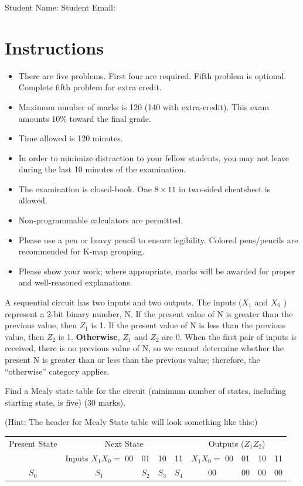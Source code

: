 \maketitle

Student Name: \hfill Student Email: \hspace{10em}
\section{Instructions}
\begin{itemize}
  \item There are five problems. First four are required. Fifth problem is optional. Complete fifth problem for extra credit.
  \item Maximum number of marks is 120 (140 with extra-credit). This exam
  amounts 10\% toward the final grade.
  \item Time allowed is 120 minutes.
  \item In order to minimize distraction to your fellow students, you may not leave
  during the last 10 minutes of the examination.
  \item The examination is closed-book. One $8\times11$ in two-sided cheatsheet is allowed.
  \item Non-programmable calculators are permitted.
  \item Please use a pen or heavy pencil to ensure legibility. Colored
    pens/pencils are recommended for K-map grouping.
  \item Please show your work; where appropriate, marks will be awarded for proper and well-reasoned explanations.
\end{itemize}
\newpage

\begin{prob}
  A sequential circuit has two inputs and two outputs. The inputs ($X_1$ and $X_0$ ) represent a 2-bit binary number, N. If the present value of N is greater than the previous value, then $Z_1$ is 1. If the present value of N is less than the previous value, then $Z_2$ is 1. \textbf{Otherwise}, $Z_1$ and $Z_2$ are 0. When the first pair of inputs is received, there is no previous value of N, so we cannot determine whether the present N is greater than or less than the previous value; therefore, the “otherwise” category applies.

Find a Mealy state table for the circuit (minimum number of states, including starting state, is five) (30 marks).
\label{p:fsm}
\end{prob}
(Hint: The header for Mealy State table will look something like this:)\\
\begin{tabular}{c|c|c|c|c|c|c|c|c}
  \toprule
  Present State & \multicolumn{4}{c|}{ Next State} & \multicolumn{4}{c}{Outputs ($Z_1 Z_2$)} \\
                & Inputs $X_1X_0=$ 00 & 01 & 10 & 11 & $X_1X_0=$ 00 & 01 & 10 & 11 \\
  \midrule
  $S_0$  & $S_1$ & $S_2$ & $S_3$ & $S_4$ & 00 & 00 & 00 & 00 \\
\end{tabular}
\newpage

